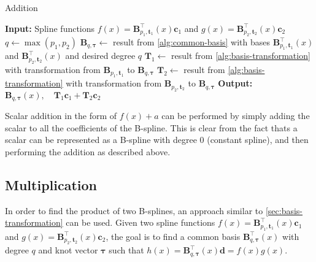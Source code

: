 \begin{algorithm}
    \caption{Addition}\label{alg:addition}
    \begin{algorithmic}[1]
        \State \textbf{Input:} Spline functions $f(x) = \mathbf{B}_{p_1, \mathbf{t}_1}^{\top}(x) \mathbf{c}_1$ and $g(x) = \mathbf{B}_{p_2, \mathbf{t}_2}^{\top}(x) \mathbf{c}_2$
        \State $q \gets \max(p_1, p_2)$
        \State $\mathbf B_{q, \boldsymbol{\tau}} \gets $ result from \cref{alg:common-basis} with bases $\mathbf{B}_{p_1, \mathbf{t}_1}^{\top}(x)$ and $\mathbf{B}_{p_2, \mathbf{t}_2}^{\top}(x)$ and desired degree $q$
        \State $\mathbf T_1 \gets $ result from \cref{alg:basis-transformation} with transformation from $\mathbf B_{p_1, \mathbf{t}_1}$ to $\mathbf B_{q, \boldsymbol{\tau}}$
        \State $\mathbf T_2 \gets $ result from \cref{alg:basis-transformation} with transformation from $\mathbf B_{p_2, \mathbf{t}_2}$ to $\mathbf B_{q, \boldsymbol{\tau}}$
        \State \textbf{Output:} $\mathbf B_{q, \boldsymbol{\tau}}(x), \quad\mathbf T_1 \mathbf c_1 + \mathbf T_2 \mathbf c_2$
    \end{algorithmic}
\end{algorithm}

Scalar addition in the form of $f(x) + a$ can be performed by simply adding the scalar to all the coefficients of the B-spline. This is clear from the fact thats a scalar can be represented as a B-spline with degree $0$ (constant spline), and then performing the addition as described above. 

\subsection{Multiplication}\label{sec:multiplication}

In order to find the product of two B-splines, an approach similar to \cref{sec:basis-transformation} can be used. Given two spline functions $f(x) = \mathbf{B}_{p_1, \mathbf{t}_1}^{\top}(x) \mathbf{c}_1$ and $g(x) = \mathbf{B}_{p_2, \mathbf{t}_2}^{\top}(x) \mathbf{c}_2$, the goal is to find a common basis $\mathbf{B}_{q, \boldsymbol{\tau}}^{\top}(x)$ with degree $q$ and knot vector $\boldsymbol{\tau}$ such that $h(x) = \mathbf{B}_{q, \boldsymbol{\tau}}^{\top}(x) \mathbf{d} = f(x)  g(x)$.


